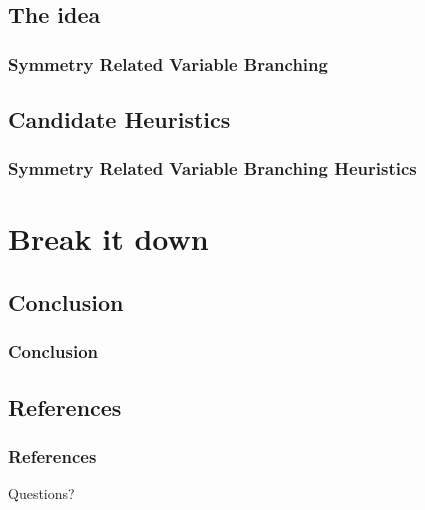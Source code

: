 \documentclass{beamer}
\begin{document}
	\subsection{The idea}
	\begin{frame}
		\frametitle{Symmetry Related Variable Branching}
	\end{frame}

	\subsection{Candidate Heuristics}
	\begin{frame}
		\frametitle{Symmetry Related Variable Branching Heuristics}
	\end{frame}

\section{Break it down}

	\subsection{Conclusion}
	\begin{frame}
		\frametitle{Conclusion}
	\end{frame}

	\subsection{References}
	\begin{frame}[allowframebreaks]
		\frametitle{References}
		\nocite{*} %
		
		
	\end{frame}

	\begin{frame}
	\Huge{\centerline{Questions?}}
	\end{frame}
\end{document}

